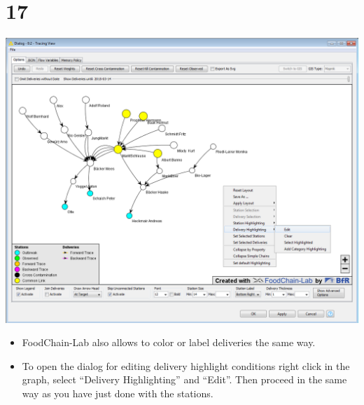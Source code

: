 \documentclass[10pt]{beamer}
\begin{document}
\section{17}
\begin{frame}
	\begin{center}
  		\includegraphics[height=0.6\textheight]{17.png}
	\end{center}
	\begin{itemize}
		\item FoodChain-Lab also allows to color or label deliveries the same way.
		\item To open the dialog for editing delivery highlight conditions right click in the graph, select ``Delivery Highlighting'' and ``Edit''. Then proceed in the same way as you have just done with the stations.
	\end{itemize}
\end{frame}
\end{document}
